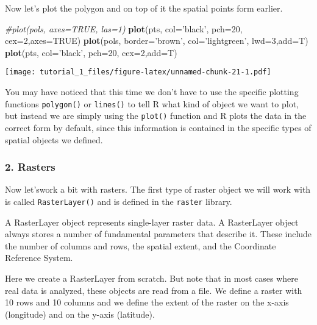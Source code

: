 \documentclass[]{article}
\newenvironment{Shaded}{\begin{snugshade}}{\end{snugshade}}
\newcommand{\CommentTok}[1]{\textcolor[rgb]{0.56,0.35,0.01}{\textit{#1}}}
\newcommand{\DataTypeTok}[1]{\textcolor[rgb]{0.13,0.29,0.53}{#1}}
\newcommand{\DecValTok}[1]{\textcolor[rgb]{0.00,0.00,0.81}{#1}}
\newcommand{\KeywordTok}[1]{\textcolor[rgb]{0.13,0.29,0.53}{\textbf{#1}}}
\newcommand{\NormalTok}[1]{#1}
\newcommand{\OtherTok}[1]{\textcolor[rgb]{0.56,0.35,0.01}{#1}}
\newcommand{\StringTok}[1]{\textcolor[rgb]{0.31,0.60,0.02}{#1}}
\begin{document}
Now let's plot the polygon and on top of it the spatial points form
earlier.

\begin{Shaded}
\begin{Highlighting}[]
\CommentTok{#plot(pols, axes=TRUE, las=1)}
\KeywordTok{plot}\NormalTok{(pts, }\DataTypeTok{col=}\StringTok{'black'}\NormalTok{, }\DataTypeTok{pch=}\DecValTok{20}\NormalTok{, }\DataTypeTok{cex=}\DecValTok{2}\NormalTok{,}\DataTypeTok{axes=}\OtherTok{TRUE}\NormalTok{)}
\KeywordTok{plot}\NormalTok{(pols, }\DataTypeTok{border=}\StringTok{'brown'}\NormalTok{, }\DataTypeTok{col=}\StringTok{'lightgreen'}\NormalTok{, }\DataTypeTok{lwd=}\DecValTok{3}\NormalTok{,}\DataTypeTok{add=}\NormalTok{T)}
\KeywordTok{plot}\NormalTok{(pts, }\DataTypeTok{col=}\StringTok{'black'}\NormalTok{, }\DataTypeTok{pch=}\DecValTok{20}\NormalTok{, }\DataTypeTok{cex=}\DecValTok{2}\NormalTok{,}\DataTypeTok{add=}\NormalTok{T)}
\end{Highlighting}
\end{Shaded}

\texttt{[image: tutorial\_1\_files/figure-latex/unnamed-chunk-21-1.pdf]}

You may have noticed that this time we don't have to use the specific
plotting functions \texttt{polygon()} or \texttt{lines()} to tell R what
kind of object we want to plot, but instead we are simply using the
\texttt{plot()} function and R plots the data in the correct form by
default, since this information is contained in the specific types of
spatial objects we defined.

\hypertarget{rasters}{%
\subsubsection{2. Rasters}\label{rasters}}

Now let'swork a bit with rasters. The first type of raster object we
will work with is called \texttt{RasterLayer()} and is defined in the
\texttt{raster} library.

A RasterLayer object represents single-layer raster data. A RasterLayer
object always stores a number of fundamental parameters that describe
it. These include the number of columns and rows, the spatial extent,
and the Coordinate Reference System.

Here we create a RasterLayer from scratch. But note that in most cases
where real data is analyzed, these objects are read from a file. We
define a raster with 10 rows and 10 columns and we define the extent of
the raster on the x-axis (longitude) and on the y-axis (latitude).
\end{document}
